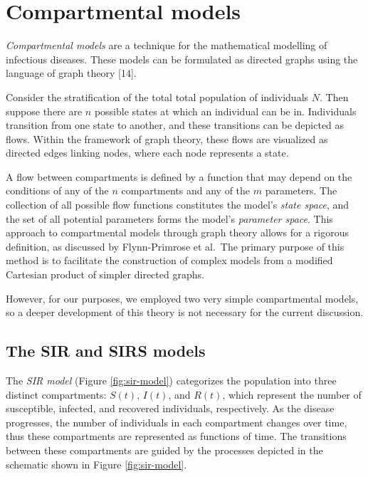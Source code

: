 \documentclass[
11pt, %
oneside, %
english, %
singlespacing, %
]{macthesis} %
\begin{document}
\section{Compartmental models}\label{Compartmental-models}

\emph{Compartmental models} are a technique for the mathematical modelling of infectious diseases. These models can be formulated as directed graphs using the language of graph theory {[}14{]}.

Consider the stratification of the total total population of individuals \(N\). Then suppose there are \(n\) possible states at which an individual can be in. Individuals transition from one state to another, and these transitions can be depicted as flows. Within the framework of graph theory, these flows are visualized as directed edges linking nodes, where each node represents a state.

A flow between compartments is defined by a function that may depend on the conditions of any of the \(n\) compartments and any of the \(m\) parameters. The collection of all possible flow functions constitutes the model's \emph{state space}, and the set of all potential parameters forms the model's \emph{parameter space}. This approach to compartmental models through graph theory allows for a rigorous definition, as discussed by Flynn-Primrose et al.~The primary purpose of this method is to facilitate the construction of complex models from a modified Cartesian product of simpler directed graphs.

However, for our purposes, we employed two very simple compartmental models, so a deeper development of this theory is not necessary for the current discussion.

\subsection{The SIR and SIRS models}\label{the-sir-and-sirs-models}

The \emph{SIR model} (Figure \ref{fig:sir-model}) categorizes the population into three distinct compartments: \(S(t)\), \(I(t)\), and \(R(t)\), which represent the number of susceptible, infected, and recovered individuals, respectively. As the disease progresses, the number of individuals in each compartment changes over time, thus these compartments are represented as functions of time. The transitions between these compartments are guided by the processes depicted in the schematic shown in Figure \ref{fig:sir-model}.
\end{document}
